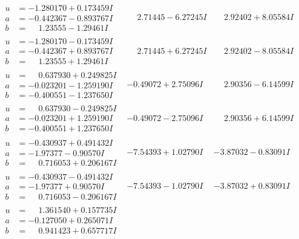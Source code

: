 \documentclass[1p]{elsarticle_modified}
\theoremstyle{definition}
\begin{document}
$$\begin{array}{c|c|c}
\begin{aligned}
u &= -1.280170 + 0.173459 I \\
a &= -0.442367 - 0.893767 I \\
b &= \phantom{-}1.23555 - 1.29461 I\end{aligned}
 & \phantom{-}2.71445 - 6.27245 I & \phantom{-}2.92402 + 8.05584 I \\ \hline\begin{aligned}
u &= -1.280170 - 0.173459 I \\
a &= -0.442367 + 0.893767 I \\
b &= \phantom{-}1.23555 + 1.29461 I\end{aligned}
 & \phantom{-}2.71445 + 6.27245 I & \phantom{-}2.92402 - 8.05584 I \\ \hline\begin{aligned}
u &= \phantom{-}0.637930 + 0.249825 I \\
a &= -0.023201 - 1.259190 I \\
b &= -0.400551 - 1.237650 I\end{aligned}
 & -0.49072 + 2.75096 I & \phantom{-}2.90356 - 6.14599 I \\ \hline\begin{aligned}
u &= \phantom{-}0.637930 - 0.249825 I \\
a &= -0.023201 + 1.259190 I \\
b &= -0.400551 + 1.237650 I\end{aligned}
 & -0.49072 - 2.75096 I & \phantom{-}2.90356 + 6.14599 I \\ \hline\begin{aligned}
u &= -0.430937 + 0.491432 I \\
a &= -1.97377 - 0.90570 I \\
b &= \phantom{-}0.716053 + 0.206167 I\end{aligned}
 & -7.54393 + 1.02790 I & -3.87032 - 0.83091 I \\ \hline\begin{aligned}
u &= -0.430937 - 0.491432 I \\
a &= -1.97377 + 0.90570 I \\
b &= \phantom{-}0.716053 - 0.206167 I\end{aligned}
 & -7.54393 - 1.02790 I & -3.87032 + 0.83091 I \\ \hline\begin{aligned}
u &= \phantom{-}1.361540 + 0.157735 I \\
a &= -0.127050 + 0.265071 I \\
b &= \phantom{-}0.941423 + 0.657717 I\end{aligned}

\end{array}$$
\end{document}

